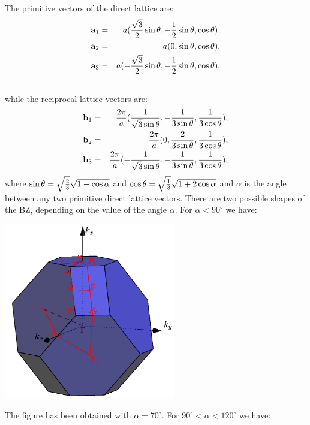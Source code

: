 \documentclass[12pt,a4paper]{article}
\begin{document}
The primitive vectors of the direct lattice are:
\begin{eqnarray}
{\bf a}_1 &=& a ({\sqrt{3}\over 2}\sin{\theta}, -{1\over 2} \sin{\theta},
          \cos{\theta}), 
\nonumber \\
{\bf a}_2 &=& a (0, \sin{\theta}, \cos{\theta}), 
\nonumber \\
{\bf a}_3 &=& a (-{\sqrt{3}\over 2} \sin{\theta}, -{1\over 2} \sin{\theta},
         \cos{\theta}), 
\nonumber \\
\nonumber
\end{eqnarray}
while the reciprocal lattice vectors are:
\begin{eqnarray}
{\bf b}_1 &=& {2\pi \over a} ({1\over \sqrt{3} \sin{\theta}}, 
-{1 \over 3 \sin{\theta}}, {1\over 3 \cos{\theta}}), \nonumber \\
{\bf b}_2 &=& {2\pi \over a} (0, 
{2 \over 3 \sin{\theta}}, {1\over 3 \cos{\theta}}), \nonumber \\
{\bf b}_3 &=& {2\pi \over a} (-{1\over \sqrt{3} \sin{\theta}}, 
-{1 \over 3 \sin{\theta}}, {1\over 3 \cos{\theta}}), \nonumber \\
\end{eqnarray}
where $\sin{\theta}=\sqrt{2\over 3}\sqrt{1-\cos{\alpha}}$
and $\cos{\theta}=\sqrt{1\over 3}\sqrt{1 + 2 \cos{\alpha}}$ and $\alpha$
is the angle between any two primitive direct lattice vectors.
There are two possible shapes of the BZ, depending on the
value of the angle $\alpha$. For $\alpha < 90^\circ$ we
have:
\begin{center}
\includegraphics[width=7.5cm,angle=0]{images/tri_1.png}
\end{center}
The figure has been obtained with $\alpha=70^\circ$.
For $90^\circ < \alpha < 120^\circ$ we have:
\end{document}
